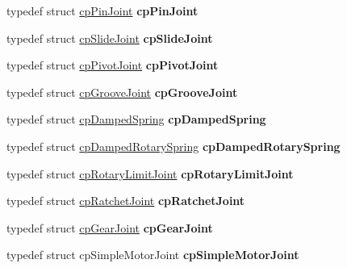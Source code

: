 \begin{DoxyCompactItemize}
\item 
\mbox{\label{group__misc_ga842072215937b61bb52852bec19367ad}} 
typedef struct \hyperlink{structcpPinJoint}{cp\+Pin\+Joint} {\bfseries cp\+Pin\+Joint}
\item 
\mbox{\label{group__misc_ga22c80982fc779df42ada48f0f35c326c}} 
typedef struct \hyperlink{structcpSlideJoint}{cp\+Slide\+Joint} {\bfseries cp\+Slide\+Joint}
\item 
\mbox{\label{group__misc_ga6be42317226c36d7c3b71175c31bed55}} 
typedef struct \hyperlink{structcpPivotJoint}{cp\+Pivot\+Joint} {\bfseries cp\+Pivot\+Joint}
\item 
\mbox{\label{group__misc_ga4aa4733fb7b33f6650ce92a7d2bf9361}} 
typedef struct \hyperlink{structcpGrooveJoint}{cp\+Groove\+Joint} {\bfseries cp\+Groove\+Joint}
\item 
\mbox{\label{group__misc_gab4c3629bf0daa6e27aaff6ac1bdc0fb7}} 
typedef struct \hyperlink{structcpDampedSpring}{cp\+Damped\+Spring} {\bfseries cp\+Damped\+Spring}
\item 
\mbox{\label{group__misc_ga48602f8d634857dac76e75f05458aea1}} 
typedef struct \hyperlink{structcpDampedRotarySpring}{cp\+Damped\+Rotary\+Spring} {\bfseries cp\+Damped\+Rotary\+Spring}
\item 
\mbox{\label{group__misc_ga54615af04b79ce2b9f2dfedc8e702da3}} 
typedef struct \hyperlink{structcpRotaryLimitJoint}{cp\+Rotary\+Limit\+Joint} {\bfseries cp\+Rotary\+Limit\+Joint}
\item 
\mbox{\label{group__misc_ga574d87330384b10b88666948ea424a50}} 
typedef struct \hyperlink{structcpRatchetJoint}{cp\+Ratchet\+Joint} {\bfseries cp\+Ratchet\+Joint}
\item 
\mbox{\label{group__misc_gac590a81b11f1ee5ae26108e24a5b6074}} 
typedef struct \hyperlink{structcpGearJoint}{cp\+Gear\+Joint} {\bfseries cp\+Gear\+Joint}
\item 
\mbox{\label{group__misc_ga946a6726ce9067b29e944ff0f9309120}} 
typedef struct cp\+Simple\+Motor\+Joint {\bfseries cp\+Simple\+Motor\+Joint}

\end{DoxyCompactItemize}
